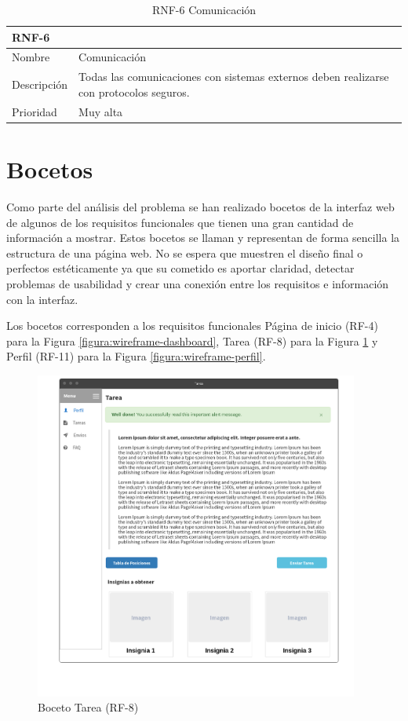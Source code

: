 \documentclass[11pt,spanish,listoffigures,listoftables]{tfgetsinf}
\begin{document}
\begin{table}[ht!]
	\centering
	\begin{tabular}{ |p{4cm}||p{10cm}|  }
		\multicolumn{2}{l}{\textbf{RNF-6}} \\
		\hline
		Nombre & Comunicación \\
		\hline
		Descripción  & Todas las comunicaciones con sistemas externos deben realizarse con protocolos seguros. \\
		\hline
		Prioridad &  Muy alta \\
		\hline
	\end{tabular}
	\caption{RNF-6 Comunicación}
	\label{table:26}
\end{table}

\section{Bocetos}

Como parte del análisis del problema se han realizado bocetos de la interfaz web de algunos de los requisitos funcionales que tienen una gran cantidad de información a mostrar. Estos bocetos se llaman  y representan de forma sencilla la estructura de una página web. No se espera que muestren el diseño final o perfectos estéticamente ya que su cometido es aportar claridad, detectar problemas de usabilidad y crear una conexión entre los requisitos e información con la interfaz.

Los bocetos corresponden a los requisitos funcionales Página de inicio (RF-4) para la Figura \ref{figura:wireframe-dashboard}, Tarea (RF-8) para la Figura \ref{figura:wireframe-tarea} y Perfil (RF-11) para la Figura \ref{figura:wireframe-perfil}.

\begin{figure}[!ht]
	\centering
	\includegraphics[width=0.95\textwidth]{img/wireframe-tarea}
	\caption[Boceto Tarea]{Boceto Tarea (RF-8)}
	\label{figura:wireframe-tarea}
\end{figure}
\end{document}
